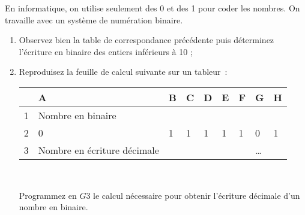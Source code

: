 \begin{TP}


En informatique, on utilise seulement des 0 et des 1 pour coder les nombres. On travaille avec un système de numération binaire.


\begin{enumerate}
 \item Observez bien la table de correspondance précédente puis déterminez l'écriture en binaire des entiers inférieurs à 10 ; \label{NbsEntMultDivis_engroupe}
 \item Reproduisez la feuille de calcul suivante sur un tableur : \\[1em]
 \begin{center}
 \begin{tabularx}{0.2\linewidth}{|X|X|X|X|X|X|X|X|X|}
 \hline
 \rowcolor{Gris2} & A & B & C & D & E & F & G & H \\\hline
 \cellcolor{Gris2} 1 & Nombre en binaire & & & & & & & \\\hline %
 \cellcolor{Gris2} 2 & 0 & 1 & 1 & 1 & 1 & 1 & 0 & 1 \\\hline
 \cellcolor{Gris2} 3 & Nombre en écriture décimale & & & & & & \ldots & \\\hline %
 \end{tabularx} \\
 \end{center}
 
 Programmez en $G3$ le calcul nécessaire pour obtenir l'écriture décimale d'un nombre en binaire.
 

\end{enumerate}
\end{TP}
